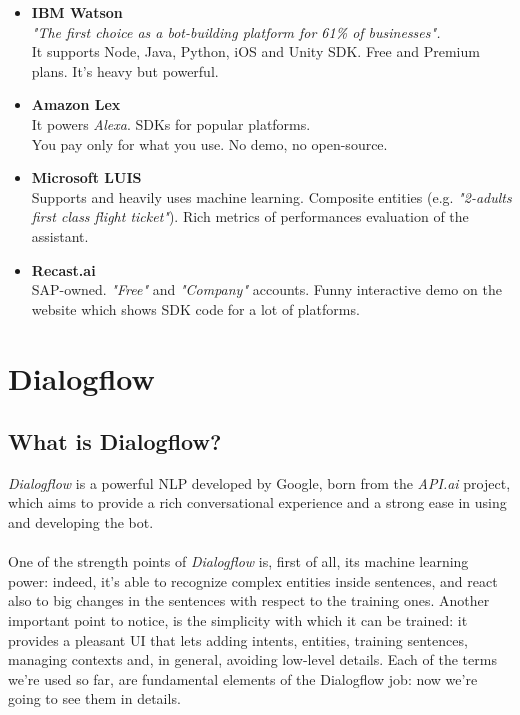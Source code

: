 \documentclass[a4paper,12pt]{report}
\begin{document}
\begin{itemize}
		\item \textbf{IBM Watson}\cite{watson}\\
		\textit{"The first choice as a bot-building platform for 61\% of businesses".}\\
		It supports Node, Java, Python, iOS and Unity SDK. Free and Premium plans. It’s heavy but powerful.
		
		\item \textbf{Amazon Lex}\cite{lex}\\
		It powers \textit{Alexa}. SDKs for popular platforms.\\
		You pay only for what you use. No demo, no open-source.
		
		\item \textbf{Microsoft LUIS}\cite{luis}\\
		Supports and heavily uses machine learning. Composite entities (e.g. \textit{"2-adults first class flight ticket"}). Rich metrics of performances evaluation of the assistant.
		
		\item \textbf{Recast.ai}\cite{recast}\\
		SAP-owned. \textit{"Free"} and \textit{"Company"} accounts. Funny interactive demo on the website which shows SDK code for a lot of platforms.
	\end{itemize}

\chapter{Dialogflow}
	\section{What is Dialogflow?}
	\textit{Dialogflow} is a powerful NLP developed by Google, born from the \textit{API.ai} project, which aims to provide a rich conversational experience and a strong ease in using and developing the bot.\\\\
	One of the strength points of \textit{Dialogflow} is, first of all, its machine learning power: indeed, it's able to recognize complex entities inside sentences, and react also to big changes in the sentences with respect to the training ones. Another important point to notice, is the simplicity with which it can be trained: it provides a pleasant UI that lets adding intents, entities, training sentences, managing contexts and, in general, avoiding low-level details. Each of the terms we're used so far, are fundamental elements of the Dialogflow job: now we're going to see them in details.
	
\end{document}
